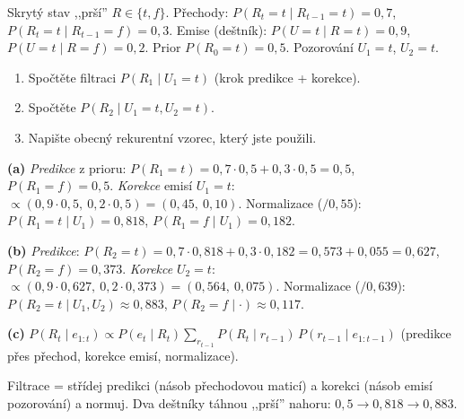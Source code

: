 \begin{zadani}
Skrytý stav ,,prší'' $R\in\{t,f\}$. Přechody: $P(R_t{=}t\mid R_{t-1}{=}t)=0{,}7$, $P(R_t{=}t\mid R_{t-1}{=}f)=0{,}3$. Emise (deštník): $P(U{=}t\mid R{=}t)=0{,}9$, $P(U{=}t\mid R{=}f)=0{,}2$. Prior $P(R_0{=}t)=0{,}5$. Pozorování $U_1{=}t$, $U_2{=}t$.
\begin{enumerate}[label=(\alph*)]
  \item {} Spočtěte filtraci $P(R_1\mid U_1{=}t)$ (krok predikce + korekce).
  \item {} Spočtěte $P(R_2\mid U_1{=}t,U_2{=}t)$.
  \item {} Napište obecný rekurentní vzorec, který jste použili.
\end{enumerate}
\end{zadani}

\begin{reseni}
\textbf{(a)} \emph{Predikce} z prioru: $P(R_1{=}t)=0{,}7\cdot0{,}5+0{,}3\cdot0{,}5=0{,}5$, $P(R_1{=}f)=0{,}5$.
\emph{Korekce} emisí $U_1{=}t$: $\propto(0{,}9\cdot0{,}5,\ 0{,}2\cdot0{,}5)=(0{,}45,\ 0{,}10)$. Normalizace ($/0{,}55$): $P(R_1{=}t\mid U_1)=0{,}818$, $P(R_1{=}f\mid U_1)=0{,}182$.

\textbf{(b)} \emph{Predikce}: $P(R_2{=}t)=0{,}7\cdot0{,}818+0{,}3\cdot0{,}182=0{,}573+0{,}055=0{,}627$, $P(R_2{=}f)=0{,}373$.
\emph{Korekce} $U_2{=}t$: $\propto(0{,}9\cdot0{,}627,\ 0{,}2\cdot0{,}373)=(0{,}564,\ 0{,}075)$. Normalizace ($/0{,}639$): $P(R_2{=}t\mid U_1,U_2)\approx0{,}883$, $P(R_2{=}f\mid\cdot)\approx0{,}117$.

\textbf{(c)} $P(R_t\mid e_{1:t})\propto P(e_t\mid R_t)\sum_{r_{t-1}}P(R_t\mid r_{t-1})\,P(r_{t-1}\mid e_{1:t-1})$ (predikce přes přechod, korekce emisí, normalizace).
\end{reseni}

\begin{jadro}
Filtrace = střídej predikci (násob přechodovou maticí) a korekci (násob emisí pozorování) a normuj. Dva deštníky táhnou ,,prší'' nahoru: $0{,}5\to0{,}818\to0{,}883$.
\end{jadro}

